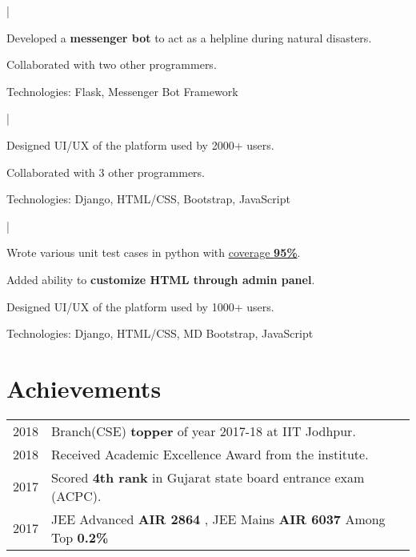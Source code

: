 \documentclass[a4paper]{deedy-resume-openfont}
\begin{document}
\begin{minipage}[t]{0.63\textwidth}
 | 
\begin{tightemize}
\item Developed a \textbf{messenger bot} to act as a helpline during natural disasters.
\item Collaborated with two other programmers.
\item Technologies: Flask, Messenger Bot Framework
\end{tightemize}
\sectionsep

 | 
\begin{tightemize}
\item Designed UI/UX of the platform used by 2000+ users.
\item Collaborated with 3 other programmers.
\item Technologies: Django, HTML/CSS, Bootstrap, JavaScript
\end{tightemize}
\sectionsep

 | 
\begin{tightemize}
\item Wrote various unit test cases in python with \href{https://coveralls.io/github/hirenchalodiya1/gymkhana_portal}{coverage \textbf{95\%}}.
\item Added ability to \textbf{customize HTML through admin panel}.
\item Designed UI/UX of the platform used by 1000+ users.
\item Technologies: Django, HTML/CSS, MD Bootstrap, JavaScript
\end{tightemize}
\sectionsep

\section{Achievements}
\begin{tabular}{l p{}}
2018 & Branch(CSE) \textbf{topper} of year 2017-18 at IIT Jodhpur. \\
2018 & Received Academic Excellence Award from the institute. \\
2017 & Scored \textbf{4th rank} in Gujarat state board entrance exam (ACPC). \\
2017 & JEE Advanced \textbf{AIR 2864} , JEE Mains \textbf{AIR 6037} Among Top \textbf{0.2\%} \\
\end{tabular}
\sectionsep


\end{minipage}
\end{document}
